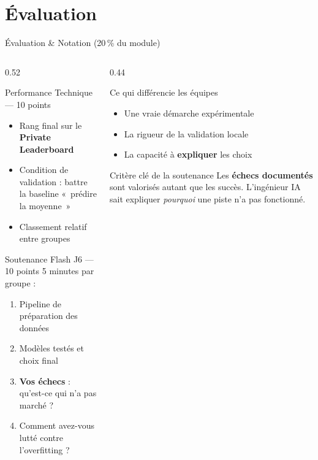 \documentclass[aspectratio=169, 10pt]{beamer}
\begin{document}
\section{Évaluation}

\begin{frame}{Évaluation \& Notation (20\,\% du module)}
  \begin{columns}[T]
    \begin{column}{0.52\textwidth}
      \begin{block}{Performance Technique --- 10 points}
        \begin{itemize}
          \item Rang final sur le \textbf{Private Leaderboard}
          \item Condition de validation : battre la baseline
                «~prédire la moyenne~»
          \item Classement relatif entre groupes
        \end{itemize}
      \end{block}
      \smallskip
      \begin{block}{Soutenance Flash J6 --- 10 points}
        5 minutes par groupe :
        \begin{enumerate}
          \item Pipeline de préparation des données
          \item Modèles testés et choix final
          \item \textbf{Vos échecs} : qu'est-ce qui n'a pas marché ?
          \item Comment avez-vous lutté contre l'overfitting ?
        \end{enumerate}
      \end{block}
    \end{column}
    \begin{column}{0.44\textwidth}
      \begin{alertblock}{Ce qui différencie les équipes}
        \begin{itemize}
          \item Une vraie démarche expérimentale
          \item La rigueur de la validation locale
          \item La capacité à \textbf{expliquer} les choix
        \end{itemize}
      \end{alertblock}
      \smallskip
      \begin{exampleblock}{Critère clé de la soutenance}
        Les \textbf{échecs documentés} sont valorisés autant
        que les succès. L'ingénieur IA sait expliquer
        \textit{pourquoi} une piste n'a pas fonctionné.
      \end{exampleblock}
    \end{column}
  \end{columns}
\end{frame}
\end{document}
